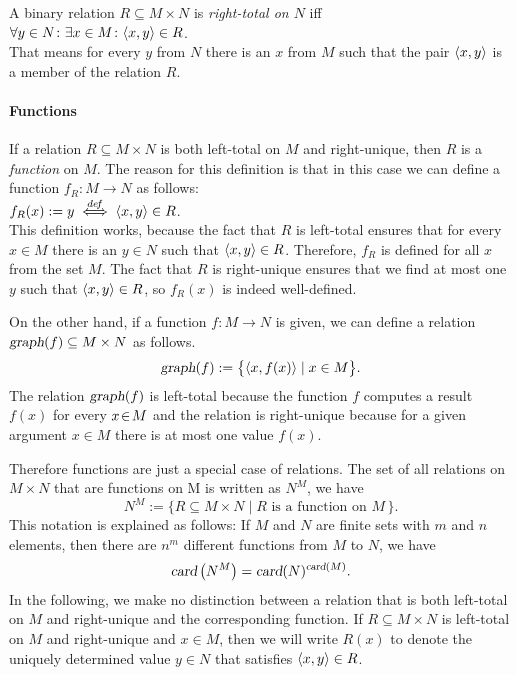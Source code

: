 A binary relation $R \subseteq M \times N$ is  \emph{right-total on $N$} iff \\[0.2cm]
\hspace*{1.3cm} $\forall y \in N \colon \exists x \in M \colon \pair(x,y) \in R$.
 \\[0.2cm]
That means for every  $y$ from $N$ there is an  $x$ from $M$ such that the pair
$\pair(x,y)$ is a member of the relation  $R$.  



\paragraph{Functions}
If a  relation $R \subseteq M \times N$ is both left-total on $M$ and right-unique, then
$R$ is a \emph{function} on $M$.  The reason for this definition is that in this case
we can define a function $f_R\colon M \rightarrow N$ as follows: \\[0.2cm]
\hspace*{1.3cm} $f_R(x) := y \;\stackrel{de\!f}{\Longleftrightarrow}\; \pair(x,y) \in R$. 
\\[0.2cm]
This definition works, because the fact that  $R$ is left-total ensures that for every 
 $x\in M$ there is an  $y \in N$ such that  $\pair(x,y) \in R$.  Therefore, $f_R$ is defined
 for all $x$ from the set $M$.   The fact that $R$ is right-unique ensures that we find at
 most one $y$ such that $\pair(x,y) \in R$, so $f_R(x)$ is indeed well-defined.

On the other hand, if a function  \mbox{$f:M \rightarrow N$} is given, we can define a relation
 $\textsl{graph}(f) \subseteq M \times N$ as follows.
\[ \textsl{graph}(f) := \bigl\{ \langle x,f(x) \rangle \mid  x\in M \bigr\}. \]
The  relation $\textsl{graph}(f)$ is left-total because the function $f$ computes a result $f(x)$
for every $x \!\in\! M$  and  the relation is right-unique because
for a given argument $x \in M$ there is at most one value $f(x)$.

Therefore functions are just a special case of relations.
The set of all relations on $M \times N$ that are functions on M is written as $N^M$, 
we have
\[ N^M := \{ R \subseteq M \times N \mid \mbox{$R$ is a function on $M$}\, \}. \]
This notation is explained as follows: If  $M$ and $N$ are finite sets with  $m$
and $n$ elements, then there are  $n^m$ different functions from  $M$ to $N$, we have
\[ \textsl{card}\left(N^M\right) = \textsl{card}(N)^{\textsl{card}(M)}. \]
In the following, we make no distinction between a relation that is both left-total on $M$
 and right-unique and the corresponding function.  If  $R \subseteq M \times N$ is
 left-total on $M$ and right-unique and $x \in M$, then we will write $R(x)$ to denote the
uniquely determined value  $y \in N$ that satisfies $\pair(x,y) \in R$.

